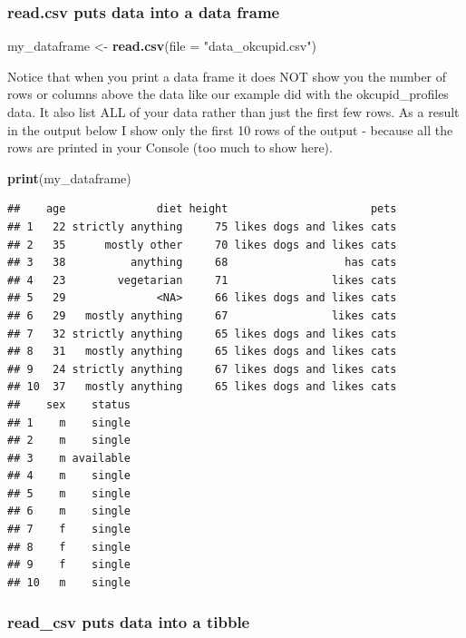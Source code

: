 \documentclass[
]{krantz}
\makeatletter
\newenvironment{Shaded}{\begin{snugshade}}{\end{snugshade}}
\newcommand{\DataTypeTok}[1]{\textcolor[rgb]{0.27,0.27,0.27}{#1}}
\newcommand{\KeywordTok}[1]{\textcolor[rgb]{0.27,0.27,0.27}{\textbf{#1}}}
\newcommand{\NormalTok}[1]{#1}
\newcommand{\StringTok}[1]{\textcolor[rgb]{0.5,0.5,0.5}{#1}}
\newenvironment{kframe}{%
\medskip{}
\setlength{\fboxsep}{.8em}
 \def\at@end@of@kframe{}%
 \ifinner\ifhmode%
  \def\at@end@of@kframe{\end{minipage}}%
  \begin{minipage}{\columnwidth}%
 \fi\fi%
 \def\FrameCommand##1{\hskip\@totalleftmargin \hskip-\fboxsep
 \colorbox{shadecolor}{##1}\hskip-\fboxsep
     \hskip-\linewidth \hskip-\@totalleftmargin \hskip\columnwidth}%
 \MakeFramed {\advance\hsize-\width
   \@totalleftmargin\z@ \linewidth\hsize
   \@setminipage}}%
 {\par\unskip\endMakeFramed%
 \at@end@of@kframe}
\renewenvironment{Shaded}{\begin{kframe}}{\end{kframe}}
\makeatother
\begin{document}
\hypertarget{read.csv-puts-data-into-a-data-frame}{%
\subsubsection{read.csv puts data into a data frame}\label{read.csv-puts-data-into-a-data-frame}}

\begin{Shaded}
\begin{Highlighting}[]
\NormalTok{my_dataframe <-}\StringTok{ }\KeywordTok{read.csv}\NormalTok{(}\DataTypeTok{file =} \StringTok{"data_okcupid.csv"}\NormalTok{)}
\end{Highlighting}
\end{Shaded}

Notice that when you print a data frame it does NOT show you the number of rows or columns above the data like our example did with the okcupid\_profiles data. It also list ALL of your data rather than just the first few rows. As a result in the output below I show only the first 10 rows of the output - because all the rows are printed in your Console (too much to show here).

\begin{Shaded}
\begin{Highlighting}[]
\KeywordTok{print}\NormalTok{(my_dataframe)}
\end{Highlighting}
\end{Shaded}

\begin{verbatim}
##    age              diet height                      pets
## 1   22 strictly anything     75 likes dogs and likes cats
## 2   35      mostly other     70 likes dogs and likes cats
## 3   38          anything     68                  has cats
## 4   23        vegetarian     71                likes cats
## 5   29              <NA>     66 likes dogs and likes cats
## 6   29   mostly anything     67                likes cats
## 7   32 strictly anything     65 likes dogs and likes cats
## 8   31   mostly anything     65 likes dogs and likes cats
## 9   24 strictly anything     67 likes dogs and likes cats
## 10  37   mostly anything     65 likes dogs and likes cats
##    sex    status
## 1    m    single
## 2    m    single
## 3    m available
## 4    m    single
## 5    m    single
## 6    m    single
## 7    f    single
## 8    f    single
## 9    f    single
## 10   m    single
\end{verbatim}

\hypertarget{read_csv-puts-data-into-a-tibble}{%
\subsubsection{read\_csv puts data into a tibble}\label{read_csv-puts-data-into-a-tibble}}
\end{document}
